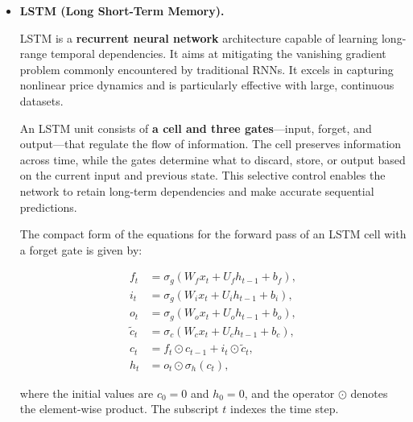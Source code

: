 \begin{itemize}

  \item \textbf{LSTM (Long Short-Term Memory).}
  
  LSTM is a \textbf{recurrent neural network} architecture capable of learning long-range temporal dependencies.
  It aims at mitigating the vanishing gradient problem commonly encountered by traditional RNNs.
  It excels in capturing nonlinear price dynamics and is particularly effective with large, continuous datasets.

  An LSTM unit consists of \textbf{a cell and three gates}---input, forget, and output---that regulate the flow of information.
The cell preserves information across time, while the gates determine what to discard, store, or output based on the current input and previous state.
This selective control enables the network to retain long-term dependencies and make accurate sequential predictions.

The compact form of the equations for the forward pass of an LSTM cell with a forget gate is given by:

\begin{align}
f_t &= \sigma_g(W_f x_t + U_f h_{t-1} + b_f), \\
i_t &= \sigma_g(W_i x_t + U_i h_{t-1} + b_i), \\
o_t &= \sigma_g(W_o x_t + U_o h_{t-1} + b_o), \\
\tilde{c}_t &= \sigma_c(W_c x_t + U_c h_{t-1} + b_c), \\
c_t &= f_t \odot c_{t-1} + i_t \odot \tilde{c}_t, \\
h_t &= o_t \odot \sigma_h(c_t),
\end{align}

where the initial values are \( c_0 = 0 \) and \( h_0 = 0 \), and the operator \( \odot \) denotes the element-wise product.  
The subscript \( t \) indexes the time step.


\end{itemize}
